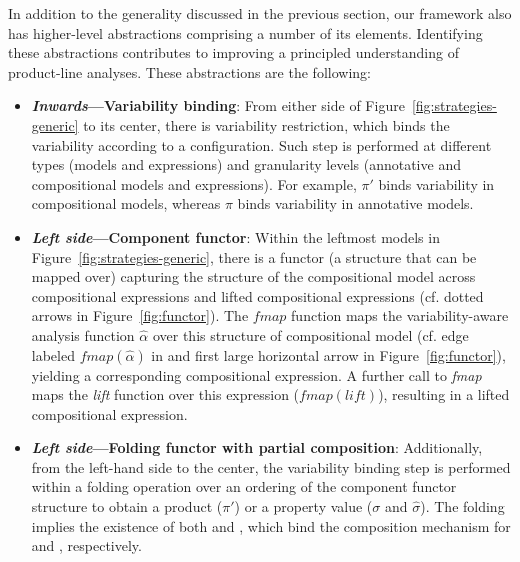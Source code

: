 \label{framework:discussion}

In addition to the generality discussed in the previous section, our framework also has higher-level abstractions comprising a number of its elements. Identifying these abstractions  contributes to improving a principled understanding of product-line analyses. These abstractions are the following:

\begin{itemize}

    \item \textbf{\textit{Inwards}---Variability binding}: From  either side of Figure~\ref{fig:strategies-generic} to its center, there is variability restriction, which binds the variability according to a configuration. Such step is performed at different types (models and expressions) and granularity levels (annotative and compositional models and expressions).	
    For example, $\pi'$ binds variability in compositional models, whereas $\pi$ binds variability in annotative models.

	\item \textbf{\textit{Left side}---Component functor}: Within the leftmost models in Figure~\ref{fig:strategies-generic}, there is a functor (a structure that can be mapped over) capturing the structure of the compositional model across compositional expressions and lifted compositional expressions (cf. dotted arrows in Figure~\ref{fig:functor}). The $\mathit{fmap}$ function maps the variability-aware analysis function $\hat{\alpha}$ over this structure of compositional model 
	(cf. edge labeled $\mathit{fmap(\hat{\alpha})}$ in  and first large horizontal arrow in Figure~\ref{fig:functor}), yielding a corresponding compositional expression. A further call to \textit{fmap} maps the \textit{lift} function over this expression ($\mathit{fmap(lift)}$), resulting in a lifted compositional expression. 
	
	
	\item \textbf{\textit{Left side}---Folding functor with partial composition}:
	Additionally, from the left-hand side to the center, the variability binding step is performed within a folding operation over an ordering of the component functor structure to obtain a product ($\pi'$) or a property value 
	($\sigma$ and $\hat{\sigma}$). The folding implies the existence of both  and , which bind the composition mechanism for  and , respectively. 
	

\end{itemize}
